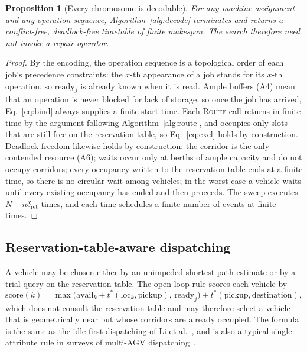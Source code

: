 \documentclass[manuscript,screen,review]{acmart}
\newtheorem{prop}{Proposition}
\begin{document}
\begin{prop}[Every chromosome is decodable]
  \label{prop:decodable}
  For any machine assignment and any operation sequence, Algorithm~\ref{alg:decode} terminates and returns a conflict-free, deadlock-free timetable of finite makespan. The search therefore need not invoke a repair operator.
\end{prop}

\begin{proof}
  By the encoding, the operation sequence is a topological order of each job's precedence constraints: the $x$-th appearance of a job stands for its $x$-th operation, so $\mathrm{ready}_j$ is already known when it is read.
  Ample buffers (A4) mean that an operation is never blocked for lack of storage, so once the job has arrived, Eq.~\eqref{eq:bind} always supplies a finite start time.
  Each \textsc{Route} call returns in finite time by the argument following Algorithm~\ref{alg:route}, and occupies only slots that are still free on the reservation table, so Eq.~\eqref{eq:excl} holds by construction.
  Deadlock-freedom likewise holds by construction: the corridor is the only contended resource (A6); waits occur only at berths of ample capacity and do not occupy corridors; every occupancy written to the reservation table ends at a finite time, so there is no circular wait among vehicles; in the worst case a vehicle waits until every existing occupancy has ended and then proceeds.
  The sweep executes $N+n\delta_{\mathrm{ret}}$ times, and each time schedules a finite number of events at finite times.
\end{proof}

\subsection{Reservation-table-aware dispatching}
\label{sec:dispatch}

A vehicle may be chosen either by an unimpeded-shortest-path estimate or by a trial query on the reservation table. The open-loop rule scores each vehicle by
\begin{equation}
\label{eq:rule}
\mathrm{score}(k)=\max\bigl(\mathrm{avail}_k+t^{*}(\mathrm{loc}_k,\text{pickup}),\,
\mathrm{ready}_j\bigr)+t^{*}(\text{pickup},\text{destination}),
\end{equation}
which does not consult the reservation table and may therefore select a vehicle that is geometrically near but whose corridors are already occupied.
The formula is the same as the idle-first dispatching of Li et al.~\cite{li2026framework}, and is also a typical single-attribute rule in surveys of multi-AGV dispatching~\cite{lu2022agv}.
\end{document}
